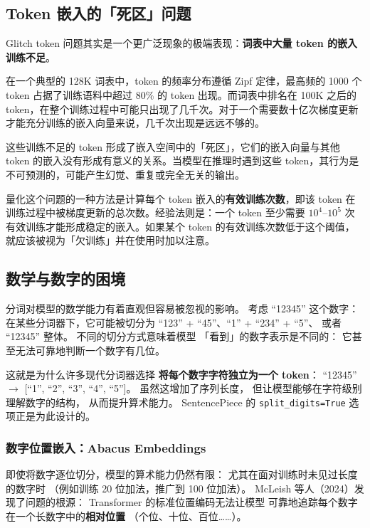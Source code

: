 \subsection{Token 嵌入的「死区」问题}

Glitch token 问题其实是一个更广泛现象的极端表现：\textbf{词表中大量 token 的嵌入训练不足}。

在一个典型的 128K 词表中，token 的频率分布遵循 Zipf 定律，最高频的 1000 个 token 占据了训练语料中超过 80\% 的 token 出现。而词表中排名在 100K 之后的 token，在整个训练过程中可能只出现了几千次。对于一个需要数十亿次梯度更新才能充分训练的嵌入向量来说，几千次出现是远远不够的。

这些训练不足的 token 形成了嵌入空间中的「死区」，它们的嵌入向量与其他 token 的嵌入没有形成有意义的关系。当模型在推理时遇到这些 token，其行为是不可预测的，可能产生幻觉、重复或完全无关的输出。

量化这个问题的一种方法是计算每个 token 嵌入的\textbf{有效训练次数}，即该 token 在训练过程中被梯度更新的总次数。经验法则是：一个 token 至少需要 $10^4$--$10^5$ 次有效训练才能形成稳定的嵌入。如果某个 token 的有效训练次数低于这个阈值，就应该被视为「欠训练」并在使用时加以注意。

\subsection{数学与数字的困境}

分词对模型的数学能力有着直观但容易被忽视的影响。
考虑 “12345” 这个数字：
在某些分词器下，它可能被切分为
“123” + “45”、“1” + “234” + “5”、
或者 “12345” 整体。
不同的切分方式意味着模型
「看到」的数字表示是不同的：
它甚至无法可靠地判断一个数字有几位。

这就是为什么许多现代分词器选择
\textbf{将每个数字字符独立为一个 token}：
“12345” $\to$ [“1”, “2”, “3”, “4”, “5”]。
虽然这增加了序列长度，
但让模型能够在字符级别理解数字的结构，
从而提升算术能力。
SentencePiece 的 \texttt{split\_digits=True}
选项正是为此设计的。

\subsubsection{数字位置嵌入：Abacus Embeddings}

即使将数字逐位切分，模型的算术能力仍然有限：
尤其在面对训练时未见过长度的数字时
（例如训练 20 位加法，推广到 100 位加法）。
McLeish 等人（2024）发现了问题的根源：
Transformer 的标准位置编码无法让模型
可靠地追踪每个数字在一个长数字中的\textbf{相对位置}
（个位、十位、百位……）。

